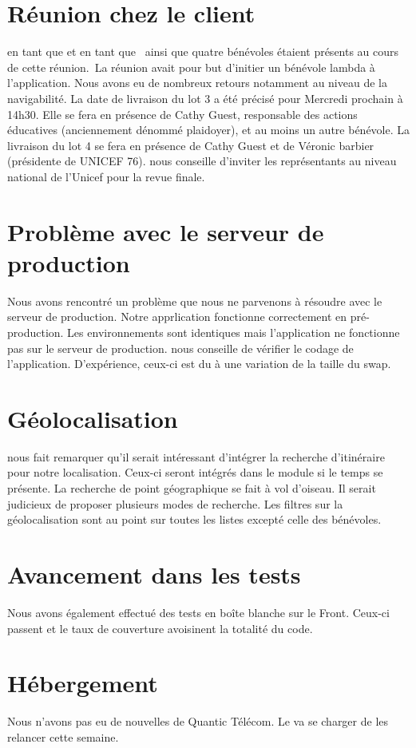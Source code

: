 \documentclass [a4paper] {article}
\begin{document}
\section{Réunion chez le client}
\Pierre{} en tant que \CP{} et \Julie{} en tant que \RD{} ainsi que quatre bénévoles étaient présents au cours de cette réunion. La réunion avait pour but d'initier un bénévole lambda à l'application.  Nous avons eu de nombreux retours notamment au niveau de la navigabilité. La date de livraison du lot 3 a été précisé pour Mercredi prochain à 14h30. Elle se fera en présence de Cathy Guest, responsable des actions éducatives (anciennement dénommé plaidoyer), et au moins un autre bénévole. La livraison du lot 4 se fera en présence de Cathy Guest et de Véronic barbier (présidente de UNICEF 76).
\nomTuteurPedago{} nous conseille d'inviter les représentants au niveau national de l'Unicef pour la revue finale.\\


\section{Problème avec le serveur de production}
Nous avons rencontré un problème que nous ne parvenons à résoudre avec le serveur de production. Notre apprlication fonctionne correctement en pré-production. Les environnements sont identiques mais l'application ne fonctionne pas sur le serveur de production. \nomTuteurPedago{} nous conseille de vérifier le codage de l'application. D'expérience, ceux-ci est du à une variation de la taille du swap.
\\

\section{Géolocalisation}
\nomTuteurPedago{} nous fait remarquer qu'il serait intéressant d'intégrer la recherche d'itinéraire pour notre localisation. Ceux-ci seront intégrés dans le module si le temps se présente. La recherche de point géographique se fait à vol d'oiseau. Il serait judicieux de proposer plusieurs modes de recherche. Les filtres sur la géolocalisation sont au point sur toutes les listes excepté celle des bénévoles.\\

\section{Avancement dans les tests}
Nous avons également effectué des tests en boîte blanche sur le Front. Ceux-ci passent et le taux de couverture avoisinent la totalité du code.\\

\section{Hébergement}
Nous n'avons pas eu de nouvelles de Quantic Télécom. Le \CP{} va se charger de les relancer cette semaine.
\newpage
\end{document}
